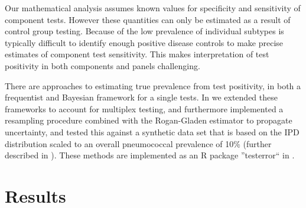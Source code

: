 \documentclass[10pt,letterpaper]{article}
\begin{document}
Our mathematical analysis assumes known values for specificity and sensitivity of component tests. However these quantities can only be estimated as a result of control group testing. Because of the low prevalence of individual subtypes is typically difficult to identify enough positive disease controls to make precise estimates of component test sensitivity. This makes interpretation of test positivity in both components and panels challenging.

There are approaches to estimating true prevalence from test positivity, in both a frequentist\cite{lang2014,thomas2022,flor2020} and Bayesian framework\cite{gelman2020,flor2020} for a single tests. In  we extended these frameworks to account for multiplex testing, and furthermore implemented a resampling procedure combined with the Rogan-Gladen estimator to propagate uncertainty, and tested this against a synthetic data set that is based on the IPD distribution scaled to an overall pneumococcal prevalence of 10\% (further described in ). These methods are implemented as an R package ''testerror`` in .

%

\section*{Results}
\end{document}
